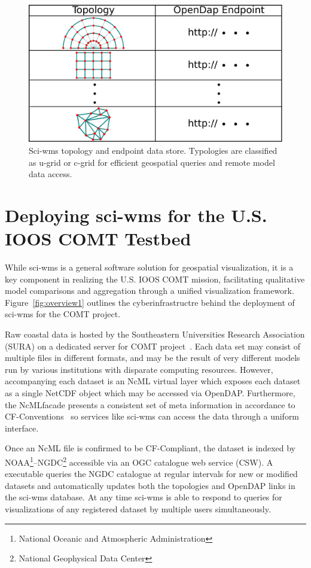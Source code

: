 \documentclass[11pt,twocolumn,twoside]{IEEEtran}
\newcommand{\comt}{COMT}
\newcommand{\ioos}{IOOS}
\newcommand{\sura}{SURA}
\newcommand{\ogc}{OGC}
\newcommand{\csw}{CSW}
\newcommand{\ugrid}{u-grid}
\newcommand{\cgrid}{c-grid}
\newcommand{\ncml}{NcML}
\newcommand{\noaa}{NOAA}
\newcommand{\ngdc}{NGDC}
\newcommand{\opendap}{OpenDAP}
\newcommand{\netcdf}{NetCDF}
\newcommand{\sciwms}{sci-wms}
\newcommand{\Sciwms}{Sci-wms}
\begin{document}
\begin{figure}
  \centering
  \includegraphics[width=\columnwidth]{./figs/sciwms_db_topology_endpoints.pdf}
  \caption{\Sciwms{} topology and endpoint data store. Typologies are
    classified as \ugrid{} or \cgrid{} for efficient geospatial
    queries and remote model data access.}
  \label{fig:sciwms_topology_endpoints}
\end{figure}

\section{Deploying \sciwms{} for the U.S. \ioos{} \comt{} Testbed}
While \sciwms{} is a general software solution for geospatial
visualization, it is a key component in realizing the U.S. \ioos{}
\comt{} mission, facilitating qualitative model comparisons and
aggregation through a unified visualization
framework. Figure~\ref{fig:overview1} outlines the cyberinfrastructre
behind the deployment of \sciwms{} for the \comt{} project.

Raw coastal data is hosted by the Southeastern Universities Research
Association (\sura{}) on a dedicated server for \comt{}
project~\cite{luettich12}. Each data set may consist of multiple files
in different formats, and may be the result of very different models
run by various institutions with disparate computing
resources. However, accompanying each dataset is an \ncml{} virtual
layer which exposes each dataset as a single \netcdf{} object which
may be accessed via \opendap{}. Furthermore, the \ncml facade presents
a consistent set of meta information in accordance to
CF-Conventions~\cite{cf} so services like \sciwms{} can access
the data through a uniform interface.

Once an \ncml{} file is confirmed to be CF-Compliant, the dataset is
indexed by \noaa{}\footnote{National Oceanic and Atmospheric
  Administration}--\ngdc{}\footnote{National Geophysical Data Center}
accessible via an \ogc{} catalogue web service (\csw{}). A executable
queries the \ngdc{} catalogue at regular intervals for new or modified
datasets and automatically updates both the topologies and \opendap{}
links in the \sciwms{} database. At any time \sciwms{} is able to
respond to queries for visualizations of any registered dataset by
multiple users simultaneously.




\end{document}
